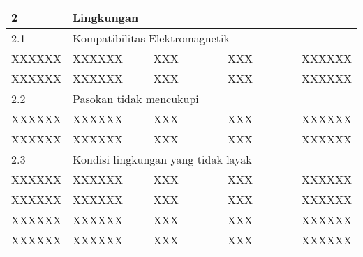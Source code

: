 \documentclass[11pt,a4paper,twoside,onecolumn]{book}
\begin{document}
\begin{table}
\begin{tabular}{p{0.1\linewidth} p{0.25\linewidth} p{0.25\linewidth} p{0.25\linewidth} p{0.15\linewidth}}
				\hline
				2 & \multicolumn{4}{l}{Lingkungan} \\
				\hline
				2.1 & \multicolumn{4}{l}{Kompatibilitas Elektromagnetik} \\
				\hline
				{XXXXXX} & {XXXXXX} & {XXX} & {XXX} & {XXXXXX} \\
				\hline
				{XXXXXX} & {XXXXXX} & {XXX} & {XXX} & {XXXXXX} \\
				\hline
				
				2.2 & \multicolumn{4}{l}{Pasokan tidak mencukupi} \\
				\hline
				{XXXXXX} & {XXXXXX} & {XXX} & {XXX} & {XXXXXX} \\
				\hline
				{XXXXXX} & {XXXXXX} & {XXX} & {XXX} & {XXXXXX} \\
				\hline
				
				2.3 & \multicolumn{4}{l}{Kondisi lingkungan yang tidak layak} \\
				\hline
				{XXXXXX} & {XXXXXX} & {XXX} & {XXX} & {XXXXXX} \\
				\hline
				{XXXXXX} & {XXXXXX} & {XXX} & {XXX} & {XXXXXX} \\
				\hline
				{XXXXXX} & {XXXXXX} & {XXX} & {XXX} & {XXXXXX} \\
				\hline						
				{XXXXXX} & {XXXXXX} & {XXX} & {XXX} & {XXXXXX} \\
				

\end{tabular}
\end{table}
\end{document}
